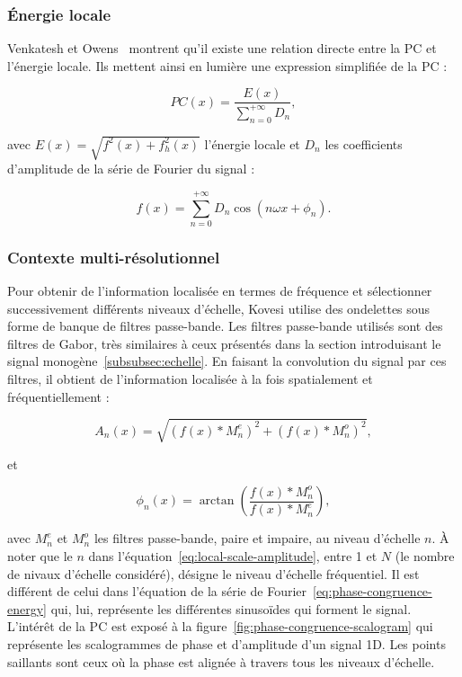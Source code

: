 \subsubsection{Énergie locale}

Venkatesh et Owens~\cite{venkatesh_energy_1989} montrent qu'il existe une relation directe entre la PC et l'énergie locale. Ils mettent ainsi en lumière une expression simplifiée de la PC :

\begin{equation}
    PC(x) = \frac{E(x)}{\sum_{n=0}^{+\infty} D_n},
\end{equation}

avec $E(x) = \sqrt{f^2(x) + f_h^2(x)}$ l'énergie locale et $D_n$ les coefficients d'amplitude de la série de Fourier du signal :

\begin{equation}
    f(x) = \sum_{n=0}^{+\infty} D_n\cos(n\omega x + \phi_n).
    \label{eq:phase-congruence-energy}
\end{equation}


\subsubsection{Contexte multi-résolutionnel}

Pour obtenir de l'information localisée en termes de fréquence et sélectionner successivement différents niveaux d'échelle, Kovesi utilise des ondelettes sous forme de banque de filtres passe-bande. Les filtres passe-bande utilisés sont des filtres de Gabor, très similaires à ceux présentés dans la section introduisant le signal monogène~\ref{subsubsec:echelle}. En faisant la convolution du signal par ces filtres, il obtient de l'information localisée à la fois spatialement et fréquentiellement :

\begin{equation}
    A_n(x) = \sqrt{(f(x)*M^e_n)^2 + (f(x)*M^o_n)^2},
    \label{eq:local-scale-amplitude}
\end{equation}

et

\begin{equation}
    \phi_n(x) = \arctan\left(\frac{f(x)*M^o_n}{f(x)*M^e_n}\right),
\end{equation}

avec $M^e_n$ et $M^o_n$ les filtres passe-bande, paire et impaire, au niveau d'échelle $n$. À noter que le $n$ dans l'équation~\ref{eq:local-scale-amplitude}, entre 1 et $N$ (le nombre de nivaux d'échelle considéré), désigne le niveau d'échelle fréquentiel. Il est différent de celui dans l'équation de la série de Fourier~\ref{eq:phase-congruence-energy} qui, lui, représente les différentes sinusoïdes qui forment le signal. L'intérêt de la PC est exposé à la figure~\ref{fig:phase-congruence-scalogram} qui représente les scalogrammes de phase et d'amplitude d'un signal 1D. Les points saillants sont ceux où la phase est alignée à travers tous les niveaux d'échelle.

